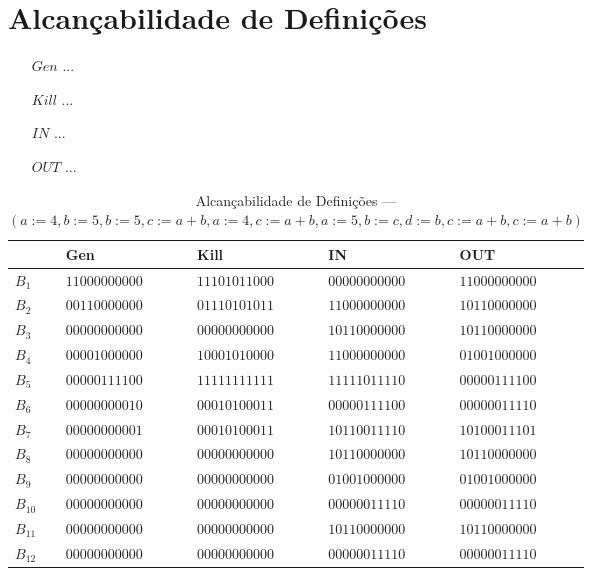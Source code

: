 \section{Alcan\c{c}abilidade de Defini\c{c}\~oes}

\begin{itemize}
  \item[$Gen$] ...
  \item[$Kill$] ...
  \item[$IN$] ...
  \item[$OUT$] ...
\end{itemize}

\begin{table}[ht]
\centering
\begin{tabular}{l|l|l|l|l}
	& Gen & Kill & IN & OUT\\
\hline
$B_{1}$ &  $11000000000$ & $11101011000$ & $00000000000$ & $11000000000$\\
$B_{2}$ &  $00110000000$ & $01110101011$ & $11000000000$ & $10110000000$\\
$B_{3}$ &  $00000000000$ & $00000000000$ & $10110000000$ & $10110000000$\\
$B_{4}$ &  $00001000000$ & $10001010000$ & $11000000000$ & $01001000000$\\
$B_{5}$ &  $00000111100$ & $11111111111$ & $11111011110$ & $00000111100$\\
$B_{6}$ &  $00000000010$ & $00010100011$ & $00000111100$ & $00000011110$\\
$B_{7}$ &  $00000000001$ & $00010100011$ & $10110011110$ & $10100011101$\\
$B_{8}$ &  $00000000000$ & $00000000000$ & $10110000000$ & $10110000000$\\
$B_{9}$ &  $00000000000$ & $00000000000$ & $01001000000$ & $01001000000$\\
$B_{10}$ &  $00000000000$ & $00000000000$ & $00000011110$ & $00000011110$\\
$B_{11}$ &  $00000000000$ & $00000000000$ & $10110000000$ & $10110000000$\\
$B_{12}$ &  $00000000000$ & $00000000000$ & $00000011110$ & $00000011110$\\
\end{tabular}
\caption{Alcan\c{c}abilidade de Defini\c{c}\~oes --- $(a:=4, b:=5, b:=5, c:=a+b, a:=4, c:=a+b, a:=5, b:=c, d:=b, c:=a+b, c:=a+b)$}
\end{table}

